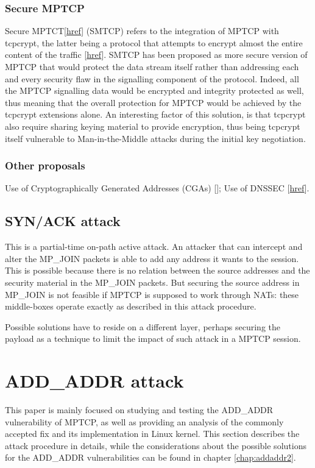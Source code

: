 \subsubsection{Secure MPTCP}
Secure MPTCT[\href{https://tools.ietf.org/html/draft-bagnulo-mptcp-secure-00}{href}] (SMTCP) refers to the integration of MPTCP with tcpcrypt, the latter being a protocol that attempts to encrypt almost the entire content of the traffic [\href{http://www.tcpcrypt.org/}{href}]. SMTCP has been proposed as more secure version of MPTCP that would protect the data stream itself rather than addressing each and every security flaw in the signalling component of the protocol. Indeed, all the MPTCP signalling data would be encrypted and integrity protected as well, thus meaning that the overall protection for MPTCP would be achieved by the tcpcrypt extensions alone. An interesting factor of this solution, is that tcpcrypt also require sharing keying material to provide encryption, thus being tcpcrypt itself vulnerable to Man-in-the-Middle attacks during the initial key negotiation.

\subsubsection{Other proposals}
Use of Cryptographically Generated Addresses (CGAs) [];
Use of DNSSEC [\href{http://www.dnssec.net/}{href}].


\subsection{SYN/ACK attack}
This is a partial-time on-path active attack. An attacker that can intercept and alter the MP\_JOIN packets is able to add any address it wants to the session. This is possible because there is no relation between the source addresses and the security material in the MP\_JOIN packets. But securing the source address in MP\_JOIN is not feasible if MPTCP is supposed to work through NATs: these middle-boxes operate exactly as described in this attack procedure. 

Possible solutions have to reside on a different layer, perhaps securing the payload as a technique to limit the impact of such attack in a MPTCP session.


\section{ADD\_ADDR attack} 
\label{theaddaddrattack}
This paper is mainly focused on studying and testing the ADD\_ADDR vulnerability of MPTCP, as well as providing an analysis of the commonly accepted fix and its implementation in Linux kernel. This section describes the attack procedure in details, while the considerations about the possible solutions for the ADD\_ADDR vulnerabilities can be found in chapter \ref{chap:addaddr2}.

